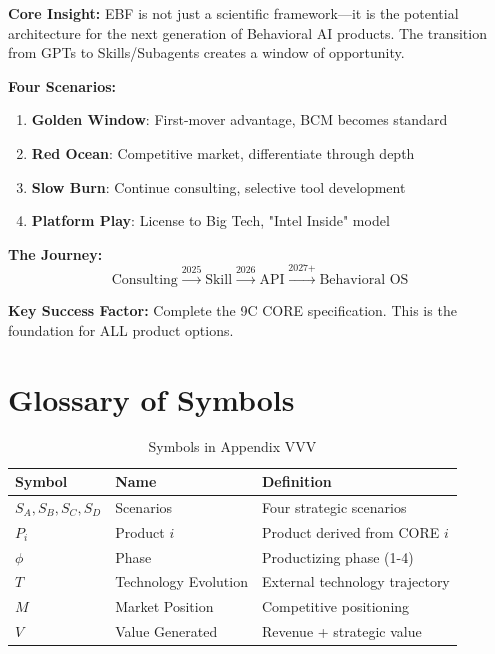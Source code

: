 \begin{tcolorbox}[colback=gray!5!white, colframe=gray!75!black,
    title=Appendix VVV Summary: Business Model \& Productizing]

\textbf{Core Insight:}
EBF is not just a scientific framework---it is the potential architecture for the next generation of Behavioral AI products. The transition from GPTs to Skills/Subagents creates a window of opportunity.

\textbf{Four Scenarios:}
\begin{enumerate}[nosep]
\item \textbf{Golden Window}: First-mover advantage, BCM becomes standard
\item \textbf{Red Ocean}: Competitive market, differentiate through depth
\item \textbf{Slow Burn}: Continue consulting, selective tool development
\item \textbf{Platform Play}: License to Big Tech, "Intel Inside" model
\end{enumerate}

\textbf{The Journey:}
\[
\text{Consulting} \xrightarrow{\text{2025}} \text{Skill} \xrightarrow{\text{2026}} \text{API} \xrightarrow{\text{2027+}} \text{Behavioral OS}
\]

\textbf{Key Success Factor:}
Complete the 9C CORE specification. This is the foundation for ALL product options.

\end{tcolorbox}


\section{Glossary of Symbols}
\label{sec:vvv-glossary}

\begin{table}[htbp]
\centering
\caption{Symbols in Appendix VVV}
\label{tab:vvv-symbols}
\renewcommand{\arraystretch}{1.3}
\begin{tabular}{@{}lll@{}}
\toprule
\textbf{Symbol} & \textbf{Name} & \textbf{Definition} \\
\midrule
$S_A, S_B, S_C, S_D$ & Scenarios & Four strategic scenarios \\
$P_{i}$ & Product $i$ & Product derived from CORE $i$ \\
$\phi$ & Phase & Productizing phase (1-4) \\
$T$ & Technology Evolution & External technology trajectory \\
$M$ & Market Position & Competitive positioning \\
$V$ & Value Generated & Revenue + strategic value \\
\bottomrule
\end{tabular}
\end{table}


